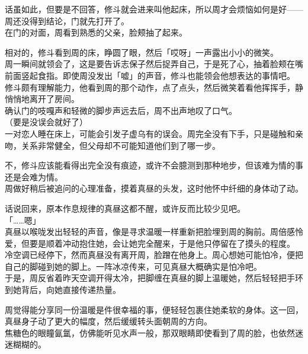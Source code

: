 话虽如此，但要是不回答，修斗就会进来叫他起床，所以周才会烦恼如何是好——周还没得到结论，门就先打开了。\\

在门的对面，周看到熟悉的父亲，脸颊抽了起来。

相对的，修斗看到周的床，睁圆了眼，然后「哎呀」一声露出小小的微笑。\\

周一瞬间就领会了，这是要告诉志保子然后捉弄自己，于是死了心，抽着脸颊在嘴前面竖起食指。即使周没发出「嘘」的声音，修斗也能领会他想表达的事情吧。\\

修斗颇有理解能力，他看到周的那个动作，点了点头，然后微笑着看他挥挥手，静悄悄地离开了房间。\\

确认门的吱嘎声和轻微的脚步声远去后，周不出声地叹了口气。\\

（要是没误会就好了）\\

一对恋人睡在床上，可能会引发子虚乌有的误会。周完全没有下手，只是碰触和亲吻，关系非常健全，但父母却不可能知道他们到了哪一步。

不，修斗应该能看得出完全没有痕迹，或许不会臆测到那种地步，但该难为情的事还是会难为情。\\

周做好稍后被追问的心理准备，摸着真昼的头发，这时他怀中纤细的身体动了动。

话说回来，原本作息规律的真昼这都不醒，或许反而比较少见吧。\\

「……嗯」\\

真昼以喉咙发出轻轻的声音，像是寻求温暖一样重新把脸埋到周的胸前。周倍感怜爱，但要是顺着冲动抱住她，会让她完全醒来，于是他只停留在了摸头的程度。\\

冷空调已经停下，然而真昼没有离开周，脸蹭在他身上。周心想她可能怕冷，便把自己的脚碰到她的脚上。一阵冰凉传来，可见真昼大概确实是怕冷吧。\\

于是，周反省着昨天空调开得太冷，把脚缠在真昼的脚上温暖她，然后轻轻把手环到她背后，向她直接传递热量。

周觉得能分享同一份温暖是件很幸福的事，便轻轻包裹住她柔软的身体。这一回，真昼身子动了更大的幅度，然后缓缓转头面朝周的方向。\\

焦糖色的眼瞳氤氲，仿佛能听见水声一般，那双眼睛即使看到了周的脸，也依然迷迷糊糊的。


